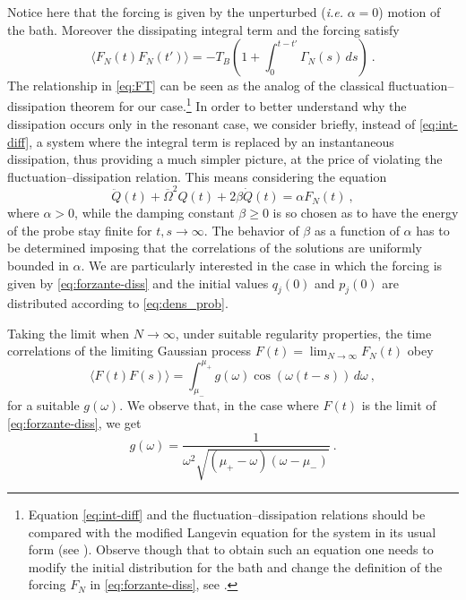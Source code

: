 \documentclass[11pt]{article}
\numberwithin{equation}{section}
\def\red{\textcolor{red}}
\def\red{}
\numberwithin{theorem}{section}
\newcommand{\dam}{\beta}
\begin{document}
\red{ Notice here that the forcing is given by the unperturbed ({\sl i.e.} $\alpha=0$) motion of the bath. 
Moreover the dissipating integral term and the forcing satisfy
\begin{equation}\label{eq:FT}
\langle F_N(t)F_N(t')\rangle = -T_B\left(1+\int_0^{t-t'}\Gamma_N (s)\,ds\right)\ .
\end{equation}
The relationship in \eqref{eq:FT} can be seen as the analog of the classical fluctuation--dissipation theorem for our 
case.\footnote{\red{Equation \eqref{eq:int-diff} and the fluctuation--dissipation
relations should be compared with the modified Langevin equation for the system in its usual form (see \cite{Ku}).
Observe though that to obtain such an equation one needs to modify the initial distribution for the bath and change the definition of the forcing $F_N$ in \eqref{eq:forzante-diss}, see \cite{Weiss}.}} In order to better understand 
why the dissipation
occurs only in the resonant case, we consider briefly, instead of \eqref{eq:int-diff}, a system where the integral term 
is replaced by an instantaneous dissipation, thus providing a much simpler picture, at the price of violating the 
fluctuation--dissipation relation. This means considering the equation}
\begin{equation}\label{eq:stocastica}
\ddot Q(t)+\overline\Omega^2Q(t) +2\dam \dot Q(t) = \alpha F_N(t)\ ,
\end{equation}
where $\alpha>0$, while the damping constant $\dam\ge 0$ is so chosen as to have the energy of the probe stay finite for
$t, s\to \infty$. The behavior of $\dam$ as a function of $\alpha$ has to be determined imposing that the correlations
of the solutions are uniformly bounded in $\alpha$. \red{We are particularly interested in the case in which the
forcing is given by \eqref{eq:forzante-diss} and the initial values $q_j(0)$ and $p_j(0)$ are distributed according to
\eqref{eq:dens_prob}.}


Taking the limit when $N\to \infty$, under suitable regularity properties, the time  correlations of the limiting 
Gaussian process $F(t)=\lim_{N\to\infty}F_N(t)$ obey
\begin{equation}\label{eq:correl_stocastica}
\langle F(t)F(s)\rangle =
\int_{\mu_-}^{\mu_+}g(\omega)\cos\left(\omega(t-s)\right)\,d\omega\ ,
\end{equation}
\red{for a suitable $g(\omega)$. We observe that, in the case where $F(t)$ is the limit of \eqref{eq:forzante-diss}, we 
get }
\begin{equation}\label{eq:Gtildeg}
g(\omega)= \frac{1}{\red{\omega^2\sqrt{(\mu_+-\omega)(\omega-\mu_-)}}}%
\ .
\end{equation}
\end{document}
